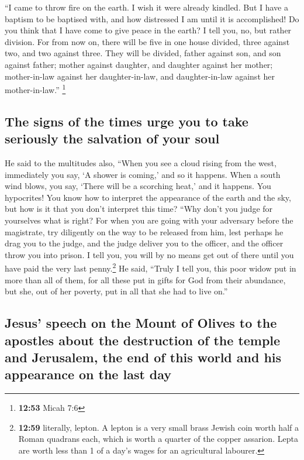  ``I came to throw fire on the earth. I wish it were
already kindled.  But I have a baptism to be baptised
with, and how distressed I am until it is accomplished! 
Do you think that I have come to give peace in the earth? I tell you,
no, but rather division.  For from now on, there will be
five in one house divided, three against two, and two against three.
 They will be divided, father against son, and son
against father; mother against daughter, and daughter against her
mother; mother-in-law against her daughter-in-law, and daughter-in-law
against her mother-in-law.'' \footnote{\textbf{12:53} Micah 7:6}

\hypertarget{the-signs-of-the-times-urge-you-to-take-seriously-the-salvation-of-your-soul}{%
\subsection{The signs of the times urge you to take seriously the
salvation of your
soul}\label{the-signs-of-the-times-urge-you-to-take-seriously-the-salvation-of-your-soul}}

 He said to the multitudes also, ``When you see a cloud
rising from the west, immediately you say, `A shower is coming,' and so
it happens.  When a south wind blows, you say, `There
will be a scorching heat,' and it happens.  You
hypocrites! You know how to interpret the appearance of the earth and
the sky, but how is it that you don't interpret this time?
 ``Why don't you judge for yourselves what is right?
 For when you are going with your adversary before the
magistrate, try diligently on the way to be released from him, lest
perhaps he drag you to the judge, and the judge deliver you to the
officer, and the officer throw you into prison.  I tell
you, you will by no means get out of there until you have paid the very
last penny.\footnote{\textbf{12:59} literally, lepton. A lepton is a
  very small brass Jewish coin worth half a Roman quadrans each, which
  is worth a quarter of the copper assarion. Lepta are worth less than 1
  of a day's wages for an agricultural labourer.}  He
said, ``Truly I tell you, this poor widow put in more than all of them,
 for all these put in gifts for God from their abundance,
but she, out of her poverty, put in all that she had to live on.''

\hypertarget{jesus-speech-on-the-mount-of-olives-to-the-apostles-about-the-destruction-of-the-temple-and-jerusalem-the-end-of-this-world-and-his-appearance-on-the-last-day}{%
\subsection{Jesus' speech on the Mount of Olives to the apostles about
the destruction of the temple and Jerusalem, the end of this world and
his appearance on the last
day}\label{jesus-speech-on-the-mount-of-olives-to-the-apostles-about-the-destruction-of-the-temple-and-jerusalem-the-end-of-this-world-and-his-appearance-on-the-last-day}}

